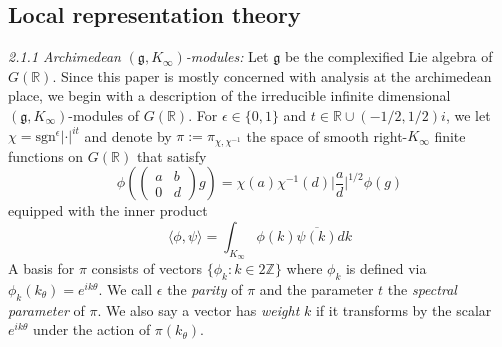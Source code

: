 \documentclass{article}
\numberwithin{equation}{section}
\begin{document}
\subsection{Local representation theory}
\emph{2.1.1 Archimedean }$(\mathfrak{g},K_\infty)$\emph{-modules:} Let $\mathfrak{g}$ be the complexified Lie algebra of $G(\mathbb{R})$. Since this paper is mostly concerned with analysis at the archimedean place, we begin with a description of the irreducible infinite dimensional $(\mathfrak{g},K_\infty)$-modules of $G(\mathbb{R})$. For $\epsilon \in \{0,1\}$ and $t \in \mathbb{R} \cup(-1/2,1/2)i $, we let $\chi=\text{sgn}^\epsilon |\cdot|^{it}$ and denote by $\pi:=\pi_{\chi,\chi^{-1}}$ the space of smooth right-$K_\infty$ finite functions on $G(\mathbb{R})$ that satisfy
\begin{equation}\label{eq:principal-series-equation}
    \phi\left(\begin{pmatrix}
    a & b \\ 0 & d
\end{pmatrix}g\right)=\chi(a)\chi^{-1}(d)\Bigr|\frac{a}{d}\Bigr|^{1/2}\phi(g)
\end{equation}
equipped with the inner product
\begin{equation}\label{eq:principal-series-inner-prod}
    \langle\phi,\psi \rangle=\int_{K_\infty}\phi(k)\overline{\psi(k)}dk
\end{equation}
A basis for $\pi$ consists of vectors $\{\phi_k: k \in 2\mathbb{Z}\}$ where $\phi_k$ is defined via $\phi_k(k_\theta)=e^{ik\theta}$. We call $\epsilon$ the \emph{parity} of $\pi$ and the parameter $t$ the \emph{spectral parameter} of $\pi$. We also say a vector has \emph{weight} $k$ if it transforms by the scalar $e^{ik\theta}$ under the action of $\pi(k_\theta)$. \bigbreak 
\end{document}
